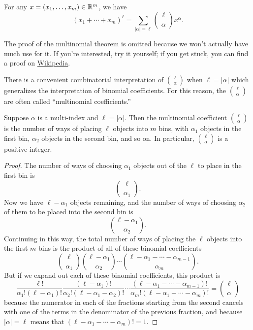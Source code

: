 \begin{theorem} \label{multinomial}
	For any $x = (x_1, \dotsc, x_m) \in \mathbb{R}^m$, we have 
	\[ (x_1 + \dotsb + x_m)^\ell = \sum_{|\alpha| = \ell} \binom{\ell}{\alpha} x^\alpha. \]
\end{theorem} 

The proof of the multinomial theorem is omitted because we won't actually have much use for it. If you're interested, try it yourself; if you get stuck, you can find a proof on \href{https://en.wikipedia.org/wiki/Multinomial_theorem}{Wikipedia}. 

There is a convenient combinatorial interpretation of $\binom{\ell}{\alpha}$ when $\ell = |\alpha|$ which generalizes the interpretation of binomial coefficients. For this reason, the $\binom{\ell}{\alpha}$ are often called ``multinomial coefficients.''

\begin{proposition} \label{multinomial-combinatorial}
	Suppose $\alpha$ is a multi-index and $\ell = |\alpha|$. Then the multinomial coefficient $\binom{\ell}{\alpha}$ is the number of ways of placing $\ell$ objects into $m$ bins, with $\alpha_1$ objects in the first bin, $\alpha_2$ objects in the second bin, and so on. In particular, $\binom{\ell}{\alpha}$ is a positive integer. 
\end{proposition}

\begin{proof}
	The number of ways of choosing $\alpha_1$ objects out of the $\ell$ to place in the first bin is
	\[ \binom{\ell}{\alpha_1}. \]
	Now we have $\ell - \alpha_1$ objects remaining, and the number of ways of choosing $\alpha_2$ of them to be placed into the second bin is 
	\[ \binom{\ell - \alpha_1}{\alpha_2}. \]
	Continuing in this way, the total number of ways of placing the $\ell$ objects into the first $m$ bins is the product of all of these binomial coefficients
	\[ \binom{\ell}{\alpha_1} \binom{\ell - \alpha_1}{\alpha_2} \dotsb \binom{\ell - \alpha_1 - \dotsb - \alpha_{m-1}}{\alpha_m}. \]
	But if we expand out each of these binomial coefficients, this product is 
	\[ \frac{\ell!}{\alpha_1!(\ell - \alpha_1)!} \frac{(\ell - \alpha_1)!}{\alpha_2!(\ell - \alpha_1 - \alpha_2)!} \dotsb \frac{(\ell - \alpha_1 - \dotsb - \alpha_{m-1})!}{\alpha_m!(\ell - \alpha_1 - \dotsb - \alpha_m)!} = \binom{\ell}{\alpha} \]
	because the numerator in each of the fractions starting from the second cancels with one of the terms in the denominator of the previous fraction, and because $|\alpha| = \ell$ means that $(\ell - \alpha_1 - \dotsb - \alpha_m)! = 1$. 
\end{proof}

